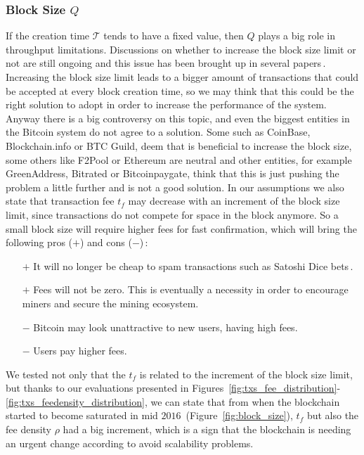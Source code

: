 \documentclass[USenglish]{uit-thesis}
\begin{document}
\subsubsection{Block Size $Q$}
If the creation time $\mathcal{T}$ tends to have a fixed value, then
$Q$ plays a big role in throughput limitations.
Discussions on whether to increase the block size
limit or not are still ongoing
and this issue has been brought up
in several papers\,\cite{Rizun:2015:blocksizelimit, houy2014EOBTF}. Increasing
the block size limit leads to a bigger amount of transactions that could
be accepted at every block creation time, so we may think that
this could be the right solution to adopt
in order to increase the performance of the system.
Anyway there is a big controversy on this topic, and even the
biggest entities in the Bitcoin system do not agree to a solution.
Some such as CoinBase, Blockchain.info or BTC Guild, deem
that is beneficial to increase the block size,
some others like F2Pool or Ethereum
are neutral and other entities, for example GreenAddress, Bitrated or
Bitcoinpaygate, think that this is just pushing the problem a little
further and is not a good solution.
In our assumptions we also state that transaction fee
$t_f$ may decrease with an increment of the block size
limit, since transactions do not compete for space in the block
anymore. So a small block size will require higher
fees for fast confirmation, which will bring the
following pros ($+$) and cons ($-$)\,\cite{blocksizecontroversy}:
\begin{itemize}
	\item [$+$] It will no longer be cheap to spam transactions such as Satoshi Dice bets\,\cite{satoshidice}.
	\item [$+$] Fees will not be zero. This is eventually a necessity in order to encourage miners and secure the mining ecosystem.
	\item [$-$] Bitcoin may look unattractive to new users, having high fees.
	\item [$-$] Users pay higher fees.
\end{itemize}
We tested not only that the $t_f$ is related
to the increment of the block
size limit, but thanks to our evaluations presented in
Figures~\ref{fig:txs_fee_distribution}-\ref{fig:txs_feedensity_distribution},
we can state that from when the blockchain started
to become saturated in mid $2016$~(Figure~\ref{fig:block_size}),
$t_f$ but also the fee density $\rho$ had a big increment,
which is a sign that the blockchain is needing an urgent
change according to
avoid scalability problems.
\end{document}
